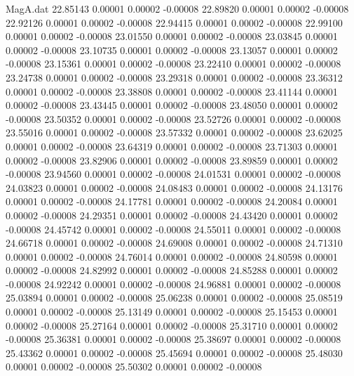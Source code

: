 \begin{filecontents}{MagA.dat}
  22.85143    0.00001    0.00002   -0.00008
  22.89820    0.00001    0.00002   -0.00008
  22.92126    0.00001    0.00002   -0.00008
  22.94415    0.00001    0.00002   -0.00008
  22.99100    0.00001    0.00002   -0.00008
  23.01550    0.00001    0.00002   -0.00008
  23.03845    0.00001    0.00002   -0.00008
  23.10735    0.00001    0.00002   -0.00008
  23.13057    0.00001    0.00002   -0.00008
  23.15361    0.00001    0.00002   -0.00008
  23.22410    0.00001    0.00002   -0.00008
  23.24738    0.00001    0.00002   -0.00008
  23.29318    0.00001    0.00002   -0.00008
  23.36312    0.00001    0.00002   -0.00008
  23.38808    0.00001    0.00002   -0.00008
  23.41144    0.00001    0.00002   -0.00008
  23.43445    0.00001    0.00002   -0.00008
  23.48050    0.00001    0.00002   -0.00008
  23.50352    0.00001    0.00002   -0.00008
  23.52726    0.00001    0.00002   -0.00008
  23.55016    0.00001    0.00002   -0.00008
  23.57332    0.00001    0.00002   -0.00008
  23.62025    0.00001    0.00002   -0.00008
  23.64319    0.00001    0.00002   -0.00008
  23.71303    0.00001    0.00002   -0.00008
  23.82906    0.00001    0.00002   -0.00008
  23.89859    0.00001    0.00002   -0.00008
  23.94560    0.00001    0.00002   -0.00008
  24.01531    0.00001    0.00002   -0.00008
  24.03823    0.00001    0.00002   -0.00008
  24.08483    0.00001    0.00002   -0.00008
  24.13176    0.00001    0.00002   -0.00008
  24.17781    0.00001    0.00002   -0.00008
  24.20084    0.00001    0.00002   -0.00008
  24.29351    0.00001    0.00002   -0.00008
  24.43420    0.00001    0.00002   -0.00008
  24.45742    0.00001    0.00002   -0.00008
  24.55011    0.00001    0.00002   -0.00008
  24.66718    0.00001    0.00002   -0.00008
  24.69008    0.00001    0.00002   -0.00008
  24.71310    0.00001    0.00002   -0.00008
  24.76014    0.00001    0.00002   -0.00008
  24.80598    0.00001    0.00002   -0.00008
  24.82992    0.00001    0.00002   -0.00008
  24.85288    0.00001    0.00002   -0.00008
  24.92242    0.00001    0.00002   -0.00008
  24.96881    0.00001    0.00002   -0.00008
  25.03894    0.00001    0.00002   -0.00008
  25.06238    0.00001    0.00002   -0.00008
  25.08519    0.00001    0.00002   -0.00008
  25.13149    0.00001    0.00002   -0.00008
  25.15453    0.00001    0.00002   -0.00008
  25.27164    0.00001    0.00002   -0.00008
  25.31710    0.00001    0.00002   -0.00008
  25.36381    0.00001    0.00002   -0.00008
  25.38697    0.00001    0.00002   -0.00008
  25.43362    0.00001    0.00002   -0.00008
  25.45694    0.00001    0.00002   -0.00008
  25.48030    0.00001    0.00002   -0.00008
  25.50302    0.00001    0.00002   -0.00008

\end{filecontents}
